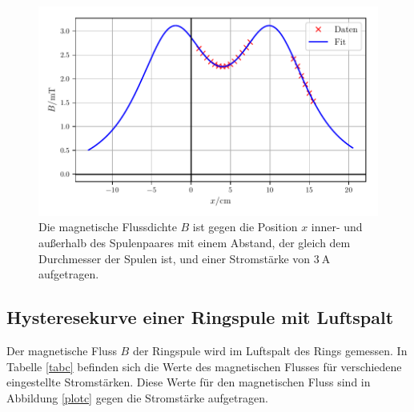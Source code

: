 \begin{figure}
    \centering
    \includegraphics{build/plotb3.pdf}
    \caption{Die magnetische Flussdichte $B$ ist gegen die Position $x$ inner-
    und außerhalb des Spulenpaares mit einem Abstand, der gleich dem Durchmesser
    der Spulen ist, und einer Stromstärke von $\SI{3}{\ampere}$ aufgetragen.}
    \label{plotb3}
\end{figure}

\noindent

\subsection{Hysteresekurve einer Ringspule mit Luftspalt}
Der magnetische Fluss $B$ der Ringspule wird im Luftspalt
des Rings gemessen.
In Tabelle \ref{tabc} befinden sich die Werte des magnetischen
Flusses für verschiedene eingestellte Stromstärken.
Diese Werte für den magnetischen Fluss sind in Abbildung
\ref{plotc} gegen die Stromstärke aufgetragen.





